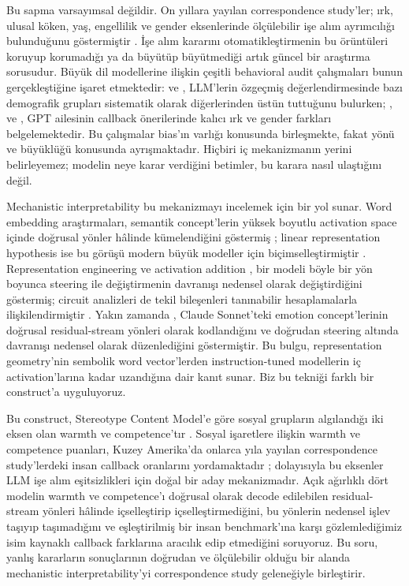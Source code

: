 \documentclass[twocolumn]{article}
\begin{document}
Bu sapma varsayımsal değildir. On yıllara yayılan correspondence study'ler;
ırk, ulusal köken, yaş, engellilik ve gender eksenlerinde ölçülebilir işe alım
ayrımcılığı bulunduğunu göstermiştir \citep{bertrand2004emily,
oreopoulos2011why, neumark2019older, correll2007getting, tilcsik2011pride,
ameri2018disability}. İşe alım kararını otomatikleştirmenin bu örüntüleri
koruyup korumadığı ya da büyütüp büyütmediği artık güncel bir araştırma
sorusudur. Büyük dil modellerine ilişkin çeşitli behavioral audit çalışmaları
bunun gerçekleştiğine işaret etmektedir: \citet{wilson2024gender} ve
\citet{chaturvedi2025callback}, LLM'lerin özgeçmiş değerlendirmesinde bazı
demografik grupları sistematik olarak diğerlerinden üstün tuttuğunu bulurken;
\citet{an2024llm}, \citet{an_measuring_2025} ve \citet{gaebler2024auditing},
GPT ailesinin callback önerilerinde kalıcı ırk ve gender farkları
belgelemektedir. Bu çalışmalar bias'ın varlığı konusunda birleşmekte, fakat
yönü ve büyüklüğü konusunda ayrışmaktadır. Hiçbiri iç mekanizmanın yerini
belirleyemez; modelin neye karar verdiğini betimler, bu karara nasıl ulaştığını
değil.

Mechanistic interpretability bu mekanizmayı incelemek için bir yol sunar. Word
embedding araştırmaları, semantik concept'lerin yüksek boyutlu activation
space içinde doğrusal yönler hâlinde kümelendiğini göstermiş
\citep{mikolov2013word2vec}; linear representation hypothesis ise bu görüşü
modern büyük modeller için biçimselleştirmiştir \citep{park2024linear}.
Representation engineering \citep{zou2023repeng} ve activation addition
\citep{turner2023activation}, bir modeli böyle bir yön boyunca steering ile
değiştirmenin davranışı nedensel olarak değiştirdiğini göstermiş; circuit
analizleri de tekil bileşenleri tanınabilir hesaplamalarla ilişkilendirmiştir
\citep{olah2020zoom}. Yakın zamanda \citet{sofroniew2026emotion}, Claude
Sonnet'teki emotion concept'lerinin doğrusal residual-stream yönleri olarak
kodlandığını ve doğrudan steering altında davranışı nedensel olarak
düzenlediğini göstermiştir. Bu bulgu, representation geometry'nin sembolik
word vector'lerden instruction-tuned modellerin iç activation'larına kadar
uzandığına dair kanıt sunar. Biz bu tekniği farklı bir construct'a uyguluyoruz.

Bu construct, Stereotype Content Model'e göre sosyal grupların algılandığı iki
eksen olan warmth ve competence'tır \citep{fiske2002model}. Sosyal işaretlere
ilişkin warmth ve competence puanları, Kuzey Amerika'da onlarca yıla yayılan
correspondence study'lerdeki insan callback oranlarını yordamaktadır
\citep{gallo2024warmth}; dolayısıyla bu eksenler LLM işe alım eşitsizlikleri
için doğal bir aday mekanizmadır. Açık ağırlıklı dört modelin warmth ve
competence'ı doğrusal olarak decode edilebilen residual-stream yönleri hâlinde
içselleştirip içselleştirmediğini, bu yönlerin nedensel işlev taşıyıp
taşımadığını ve eşleştirilmiş bir insan benchmark'ına karşı gözlemlediğimiz
isim kaynaklı callback farklarına aracılık edip etmediğini soruyoruz. Bu soru,
yanlış kararların sonuçlarının doğrudan ve ölçülebilir olduğu bir alanda
mechanistic interpretability'yi correspondence study geleneğiyle birleştirir.
\end{document}
